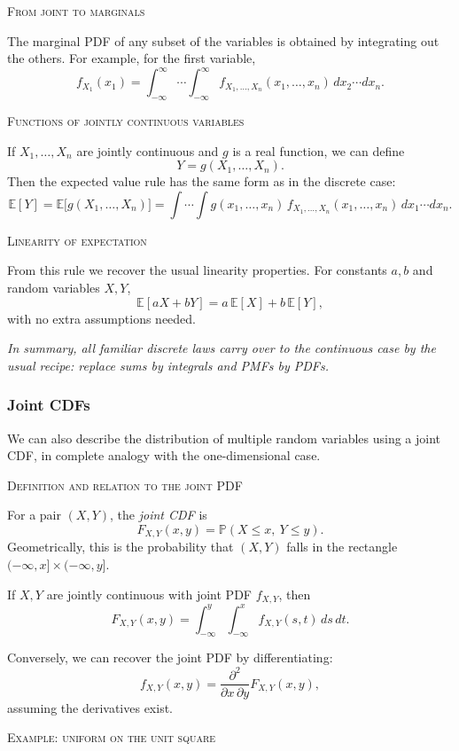 \bigskip\textsc{From joint to marginals}

The marginal PDF of any subset of the variables is obtained by integrating out the others.  
For example, for the first variable,
\[
f_{X_1}(x_1) = \int_{-\infty}^{\infty}\cdots\int_{-\infty}^{\infty}
f_{X_1,\dots,X_n}(x_1,\dots,x_n)\,dx_2\cdots dx_n.
\]

\bigskip\textsc{Functions of jointly continuous variables}

If \(X_1,\dots,X_n\) are jointly continuous and \(g\) is a real function, we can define
\[
Y = g(X_1,\dots,X_n).
\]
Then the expected value rule has the same form as in the discrete case:
\[
\mathbb{E}[Y]
=
\mathbb{E}\big[g(X_1,\dots,X_n)\big]
=
\int\cdots\int g(x_1,\dots,x_n)\,
f_{X_1,\dots,X_n}(x_1,\dots,x_n)\,dx_1\cdots dx_n.
\]

\bigskip\textsc{Linearity of expectation}

From this rule we recover the usual linearity properties.  
For constants \(a,b\) and random variables \(X,Y\),
\[
\mathbb{E}[aX + bY] = a\,\mathbb{E}[X] + b\,\mathbb{E}[Y],
\]
with no extra assumptions needed.  

\textit{In summary, all familiar discrete laws carry over to the continuous case by the usual recipe: replace sums by integrals and PMFs by PDFs.}


\subsubsection{Joint CDFs}

We can also describe the distribution of multiple random variables using a joint CDF, in complete analogy with the one-dimensional case.

\bigskip\textsc{Definition and relation to the joint PDF}

For a pair \((X,Y)\), the \textit{joint CDF} is
\[
F_{X,Y}(x,y)
=
\mathbb{P}(X \le x,\ Y \le y).
\]
Geometrically, this is the probability that \((X,Y)\) falls in the rectangle \((-\infty,x]\times(-\infty,y]\).

If \(X,Y\) are jointly continuous with joint PDF \(f_{X,Y}\), then
\[
F_{X,Y}(x,y)
=
\int_{-\infty}^{y}
\int_{-\infty}^{x}
f_{X,Y}(s,t)\,ds\,dt.
\]

Conversely, we can recover the joint PDF by differentiating:
\[
f_{X,Y}(x,y)
=
\frac{\partial^2}{\partial x\,\partial y} F_{X,Y}(x,y),
\]
assuming the derivatives exist.

\bigskip\textsc{Example: uniform on the unit square}


